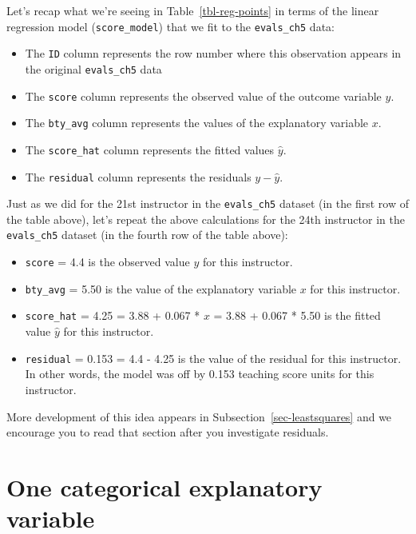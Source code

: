 \documentclass[
  letterpaper,
  DIV=11,
  numbers=noendperiod]{scrreprt}
\theoremstyle{definition}
\theoremstyle{remark}
\begin{document}
Let's recap what we're seeing in Table~\ref{tbl-reg-points} in terms of
the linear regression model (\texttt{score\_model}) that we fit to the
\texttt{evals\_ch5} data:

\begin{itemize}
\item
  The \texttt{ID} column represents the row number where this
  observation appears in the original \texttt{evals\_ch5} data
\item
  The \texttt{score} column represents the observed value of the outcome
  variable \(y\).
\item
  The \texttt{bty\_avg} column represents the values of the explanatory
  variable \(x\).
\item
  The \texttt{score\_hat} column represents the fitted values
  \(\widehat{y}\).
\item
  The \texttt{residual} column represents the residuals
  \(y - \widehat{y}\).
\end{itemize}

Just as we did for the 21st instructor in the \texttt{evals\_ch5}
dataset (in the first row of the table above), let's repeat the above
calculations for the 24th instructor in the \texttt{evals\_ch5} dataset
(in the fourth row of the table above):

\begin{itemize}
\item
  \texttt{score} = 4.4 is the observed value \(y\) for this instructor.
\item
  \texttt{bty\_avg} = 5.50 is the value of the explanatory variable
  \(x\) for this instructor.
\item
  \texttt{score\_hat} = 4.25 = 3.88 + 0.067 * \(x\) = 3.88 + 0.067 *
  5.50 is the fitted value \(\widehat{y}\) for this instructor.
\item
  \texttt{residual} = 0.153 = 4.4 - 4.25 is the value of the residual
  for this instructor. In other words, the model was off by 0.153
  teaching score units for this instructor.
\end{itemize}

More development of this idea appears in
Subsection~\ref{sec-leastsquares} and we encourage you to read that
section after you investigate residuals.

\hypertarget{sec-model2}{%
\section{One categorical explanatory variable}\label{sec-model2}}
\end{document}
